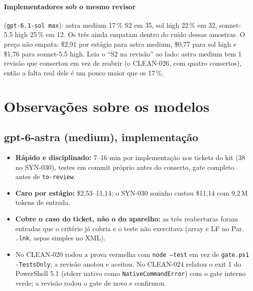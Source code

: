 \documentclass[11pt,a4paper]{article}
\begin{document}
\paragraph{Implementadores sob o mesmo revisor} (\texttt{gpt-6.1-sol max}):
astra medium 17\,\% S2 em 35, sol high 22\,\% em 32, sonnet-5.5 high 25\,\%
em 12. Os três ainda empatam dentro do ruído dessas amostras. O preço não
empata: \$2,91 por estágio para astra medium, \$0,77 para sol high e \$1,76
para sonnet-5.5 high. Leia o ``S2 na revisão'' ao lado: astra medium tem 1
revisão que consertou em vez de reabrir (o CLEAN-026, com quatro consertos),
então a falta real dele é um pouco maior que os 17\,\%.

\section{Observações sobre os modelos}

\subsection*{gpt-6-astra (medium), implementação}
\begin{itemize}
  \item \textbf{Rápido e disciplinado:} 7--16 min por implementação nos
        tickets do kit (38 no SYN-030), testes em commit próprio antes do
        conserto, gate completo antes de \texttt{to-review}.
  \item \textbf{Caro por estágio:} \$2,53--11,14; o SYN-030 sozinho custou
        \$11,14 com 9,2\,M tokens de entrada.
  \item \textbf{Cobre o caso do ticket, não o do aparelho:} as três
        reaberturas foram entradas que o critério já cobria e o teste não
        exercitava (array e LF no Par, \texttt{.lnk}, aspas simples no XML).
  \item No CLEAN-020 rodou a prova vermelha com \texttt{node --test} em vez de
        \texttt{gate.ps1 -TestsOnly}; a revisão anotou e aceitou. No CLEAN-024
        relatou o exit 1 do PowerShell 5.1 (stderr nativo como
        \texttt{NativeCommandError}) com o gate interno verde; a revisão
        rodou o gate de novo e confirmou.
\end{itemize}
\end{document}
